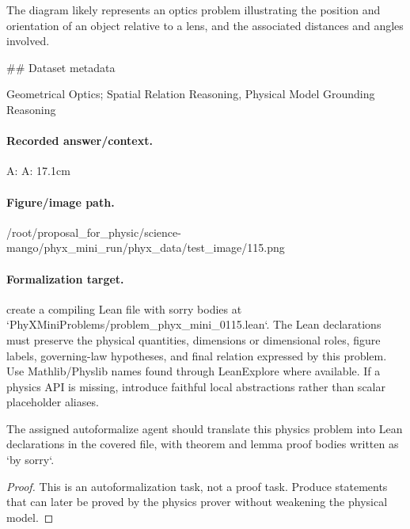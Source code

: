 The diagram likely represents an optics problem illustrating the position and orientation of an object relative to a lens, and the associated distances and angles involved.

\#\# Dataset metadata

Geometrical Optics; Spatial Relation Reasoning, Physical Model Grounding Reasoning

\paragraph{Recorded answer/context.}
A: A: 17.1cm

\paragraph{Figure/image path.}
/root/proposal\_for\_physic/science-mango/phyx\_mini\_run/phyx\_data/test\_image/115.png

\paragraph{Formalization target.}
create a compiling Lean file with sorry bodies at `PhyXMiniProblems/problem\_phyx\_mini\_0115.lean`. The Lean declarations must preserve the physical quantities, dimensions or dimensional roles, figure labels, governing-law hypotheses, and final relation expressed by this problem.
Use Mathlib/Physlib names found through LeanExplore where available. If a physics API is missing, introduce faithful local abstractions rather than scalar placeholder aliases.

\begin{theorem}
\label{thm:physics:phyx_mini_0115:target}
The assigned autoformalize agent should translate this physics problem into Lean declarations in the covered file, with theorem and lemma proof bodies written as `by sorry`.
\end{theorem}
\begin{proof}
This is an autoformalization task, not a proof task. Produce statements that can later be proved by the physics prover without weakening the physical model.
\end{proof}


